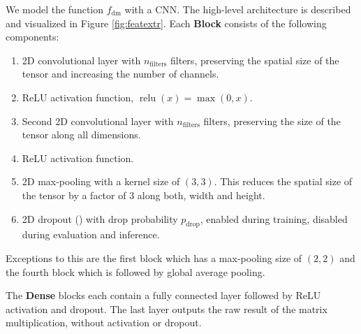We model the function $f_\text{dm}$ with a CNN. The high-level architecture is described and visualized in Figure \ref{fig:featextr}. Each \textbf{Block} consists of the following components:
\begin{enumerate}
    \item 2D convolutional layer with $n_\text{filters}$ filters, preserving the spatial size of the tensor and increasing the number of channels.
    \item ReLU activation function, $\operatorname{relu}(x)=\max(0,x)$.
    \item Second 2D convolutional layer with $n_\text{filters}$ filters, preserving the size of the tensor along all dimensions.
    \item ReLU activation function.
    \item 2D max-pooling with a kernel size of $(3,3)$. This reduces the spatial size of the tensor by a factor of $3$ along both, width and height.
    \item 2D dropout (\cite{srivastava2014:dropout}) with drop probability $p_\text{drop}$, enabled during training, disabled during evaluation and inference.
\end{enumerate}
Exceptions to this are the first block which has a max-pooling size of $(2,2)$ and the fourth block which is followed by global average pooling.

The \textbf{Dense} blocks each contain a fully connected layer followed by ReLU activation and dropout. The last layer outputs the raw result of the matrix multiplication, without activation or dropout.

